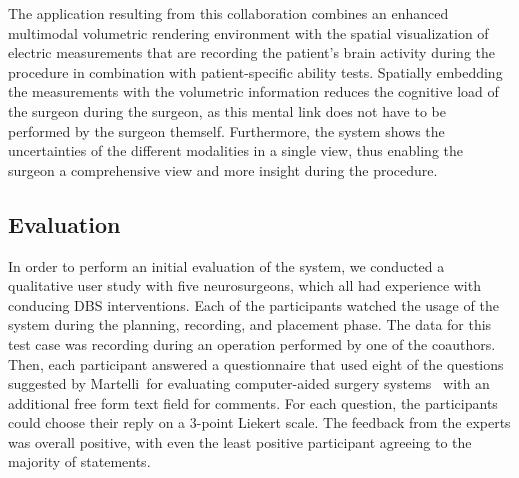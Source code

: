 The application resulting from this collaboration combines an enhanced multimodal  volumetric rendering environment with the spatial visualization of electric measurements that are recording the patient's brain activity during the procedure in combination with patient-specific ability tests. Spatially embedding the measurements with the volumetric information reduces the cognitive load of the surgeon during the surgeon, as this mental link does not have to be performed by the surgeon themself. Furthermore, the system shows the uncertainties of the different modalities in a single view, thus enabling the surgeon a comprehensive view and more insight during the procedure.


\subsection{Evaluation} \label{contributions:dbs:evaluation}
In order to perform an initial evaluation of the system, we conducted a qualitative user study with five neurosurgeons, which all had experience with conducing DBS interventions. Each of the participants watched the usage of the system during the planning, recording, and placement phase. The data for this test case was recording during an operation performed by one of the coauthors. Then, each participant answered a questionnaire that used eight of the questions suggested by Martelli~\etal for evaluating computer-aided surgery systems~\cite{martelli2003criteria} with an additional free form text field for comments.  For each question, the participants could choose their reply on a 3-point Liekert scale.  The feedback from the experts was overall positive, with even the least positive participant agreeing to the majority of statements.



